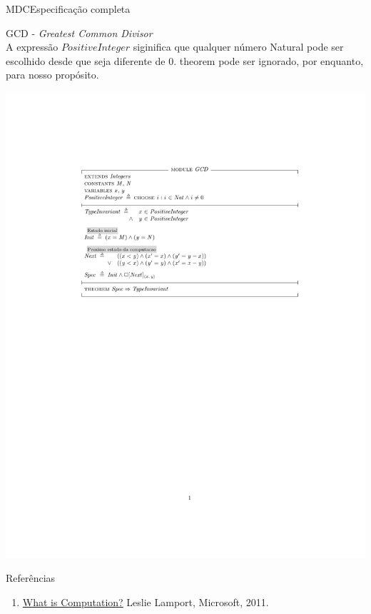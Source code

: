 \begin{frame}{MDC}{Especificação completa}

  GCD - {\em Greatest Common Divisor}\\ {\tiny A expressão
    $PositiveInteger$ siginifica que qualquer número Natural pode ser
    escolhido desde que seja diferente de $0$. {\sc theorem} pode ser
    ignorado, por enquanto, para nosso propósito.}

  \includegraphics[scale=.5]{../src/GCD.pdf}

\end{frame}

\begin{frame}{Referências}
 
  \begin{enumerate}
  \item \href{http://www.youtube.com/watch?v=BDPHfRuAFnU}{What is
      Computation?} Leslie Lamport, Microsoft, 2011.
    
  \end{enumerate}
  
\end{frame}

